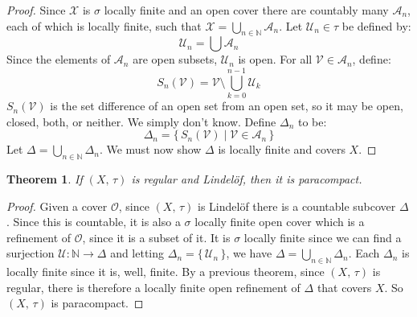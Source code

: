 \documentclass{article}
\theoremstyle{plain}
\newtheorem{theorem}{Theorem}[section]
\theoremstyle{normal}
\begin{document}
        \begin{proof}
            Since $\mathcal{X}$ is $\sigma$ locally finite and an open cover
            there are countably many $\mathcal{A}_{n}$, each of which is
            locally finite, such that
            $\mathcal{X}=\bigcup_{n\in\mathbb{N}}\mathcal{A}_{n}$. Let
            $\mathcal{U}_{n}\in\tau$ be defined by:
            \begin{equation}
                \mathcal{U}_{n}=\bigcup\mathcal{A}_{n}
            \end{equation}
            Since the elements of $\mathcal{A}_{n}$ are open subsets,
            $\mathcal{U}_{n}$ is open. For all
            $\mathcal{V}\in\mathcal{A}_{n}$, define:
            \begin{equation}
                S_{n}(\mathcal{V})=
                \mathcal{V}\setminus\bigcup_{k=0}^{n-1}\mathcal{U}_{k}
            \end{equation}
            $S_{n}(\mathcal{V})$ is the set difference of an open set from
            an open set, so it may be open, closed, both, or neither. We simply
            don't know. Define $\Delta_{n}$ to be:
            \begin{equation}
                \Delta_{n}
                =\{\,S_{n}(\mathcal{V})\;|\;\mathcal{V}\in\mathcal{A}_{n}\,\}
            \end{equation}
            Let $\Delta=\bigcup_{n\in\mathbb{N}}\Delta_{n}$. We must now show
            $\Delta$ is locally finite and covers $X$.
        \end{proof}
        \begin{theorem}
            If $(X,\,\tau)$ is regular and Lindel\"{o}f, then it is
            paracompact.
        \end{theorem}
        \begin{proof}
            Given a cover $\mathcal{O}$, since $(X,\,\tau)$ is Lindel\"{o}f
            there is a countable subcover $\Delta$. Since this is countable, it
            is also a $\sigma$ locally finite open cover which is a refinement
            of $\mathcal{O}$, since it is a subset of it. It is $\sigma$
            locally finite since we can find a surjection
            $\mathcal{U}:\mathbb{N}\rightarrow\Delta$ and letting
            $\Delta_{n}=\{\,\mathcal{U}_{n}\,\}$, we have
            $\Delta=\bigcup_{n\in\mathbb{N}}\Delta_{n}$. Each $\Delta_{n}$ is
            locally finite since it is, well, finite. By a previous theorem,
            since $(X,\,\tau)$ is regular, there is therefore a locally finite
            open refinement of $\Delta$ that covers $X$. So $(X,\,\tau)$ is
            paracompact.
        \end{proof}
\end{document}
